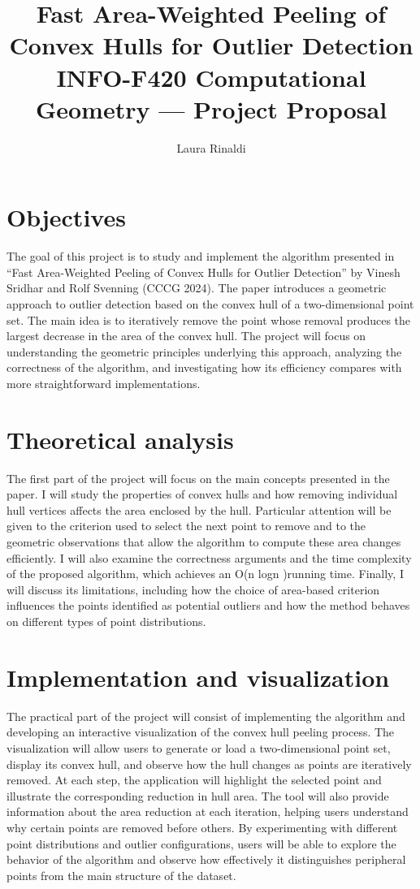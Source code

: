 \documentclass[10.5pt,a4paper]{article}
\title{\vspace{-1.5cm}\textbf{Fast Area-Weighted Peeling of Convex Hulls for Outlier Detection}\\[0.3em]
\large INFO-F420 Computational Geometry --- Project Proposal}
\author{Laura Rinaldi}
\date{\vspace{-1em}}
\begin{document}
\maketitle
\vspace{-1em}

\section*{Objectives}
The goal of this project is to study and implement the algorithm presented in “Fast Area-Weighted Peeling of Convex Hulls for Outlier Detection” by Vinesh Sridhar and Rolf Svenning (CCCG 2024). The paper introduces a geometric approach to outlier detection based on the convex hull of a two-dimensional point set. The main idea is to iteratively remove the point whose removal produces the largest decrease in the area of the convex hull.
The project will focus on understanding the geometric principles underlying this approach, analyzing the correctness of the algorithm, and investigating how its efficiency compares with more straightforward implementations.

\section*{Theoretical analysis}
The first part of the project will focus on the main concepts presented in the paper. I will study the properties of convex hulls and how removing individual hull vertices affects the area enclosed by the hull. Particular attention will be given to the criterion used to select the next point to remove and to the geometric observations that allow the algorithm to compute these area changes efficiently.
I will also examine the correctness arguments and the time complexity of the proposed algorithm, which achieves an O(n log⁡n )running time. Finally, I will discuss its limitations, including how the choice of area-based criterion influences the points identified as potential outliers and how the method behaves on different types of point distributions.

\section*{Implementation and visualization}
The practical part of the project will consist of implementing the algorithm and developing an interactive visualization of the convex hull peeling process.
The visualization will allow users to generate or load a two-dimensional point set, display its convex hull, and observe how the hull changes as points are iteratively removed. At each step, the application will highlight the selected point and illustrate the corresponding reduction in hull area.
The tool will also provide information about the area reduction at each iteration, helping users understand why certain points are removed before others. By experimenting with different point distributions and outlier configurations, users will be able to explore the behavior of the algorithm and observe how effectively it distinguishes peripheral points from the main structure of the dataset.
\end{document}
